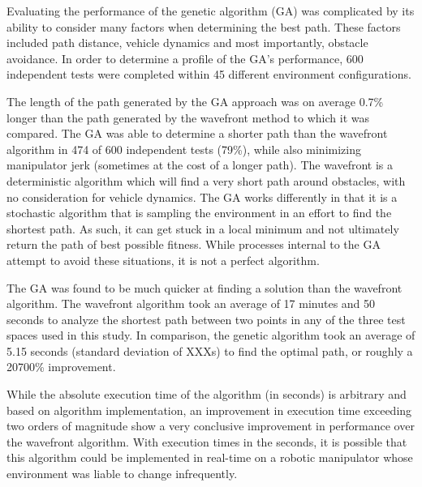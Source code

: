 %
Evaluating the performance of the genetic algorithm (GA) was complicated by its ability to consider many factors when determining the best path. These factors included path distance, vehicle dynamics and most importantly, obstacle avoidance. In order to determine a profile of the GA's performance, 600 independent tests were completed within 45 different environment configurations.

The length of the path generated by the GA approach was on average 0.7\% longer than the path generated by the wavefront method to which it was compared. The GA was able to determine a shorter path than the wavefront algorithm in 474 of 600 independent tests (79\%), while also minimizing manipulator jerk (sometimes at the cost of a longer path). The wavefront is a deterministic algorithm which will find a very short path around obstacles, with no consideration for vehicle dynamics. The GA works differently in that it is a stochastic algorithm that is sampling the environment in an effort to find the shortest path. As such, it can get stuck in a local minimum and not ultimately return the path of best possible fitness. While processes internal to the GA attempt to avoid these situations, it is not a perfect algorithm.

The GA was found to be much quicker at finding a solution than the wavefront algorithm. The wavefront algorithm took an average of 17 minutes and 50 seconds to analyze the shortest path between two points in any of the three test spaces used in this study. In comparison, the genetic algorithm took an average of 5.15 seconds (standard deviation of XXXs) to find the optimal path, or roughly a 20700\% improvement.

While the absolute execution time of the algorithm (in seconds) is arbitrary and based on algorithm implementation, an improvement in execution time exceeding two orders of magnitude show a very conclusive improvement in performance over the wavefront algorithm. With execution times in the seconds, it is possible that this algorithm could be implemented in real-time on a robotic manipulator whose environment was liable to change infrequently.

